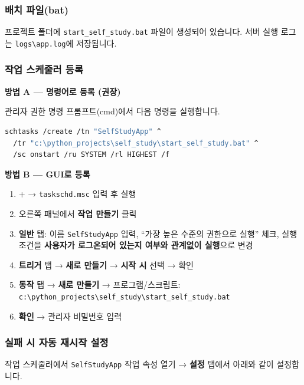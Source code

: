 \documentclass[a4paper,12pt]{article}
\newcommand{\menu}[1]{\textcolor{primary}{\textbf{#1}}}
\newcommand{\key}[1]{\fbox{\small\texttt{#1}}}
\begin{document}
\subsubsection{배치 파일(bat)}

프로젝트 폴더에 \texttt{start\_self\_study.bat} 파일이 생성되어 있습니다.
서버 실행 로그는 \texttt{logs\textbackslash app.log}에 저장됩니다.

\subsubsection{작업 스케줄러 등록}

\textbf{방법 A --- 명령어로 등록 (권장)}

관리자 권한 명령 프롬프트(cmd)에서 다음 명령을 실행합니다.

\begin{lstlisting}[language=bash, caption=작업 스케줄러 명령어 등록]
schtasks /create /tn "SelfStudyApp" ^
  /tr "c:\python_projects\self_study\start_self_study.bat" ^
  /sc onstart /ru SYSTEM /rl HIGHEST /f
\end{lstlisting}

\textbf{방법 B --- GUI로 등록}

\begin{enumerate}[leftmargin=1.5em]
    \item \key{Win}+\key{R} → \texttt{taskschd.msc} 입력 후 실행
    \item 오른쪽 패널에서 \menu{작업 만들기} 클릭
    \item \textbf{일반} 탭: 이름 \texttt{SelfStudyApp} 입력,
          ``가장 높은 수준의 권한으로 실행'' 체크,
          실행 조건을 \menu{사용자가 로그온되어 있는지 여부와 관계없이 실행}으로 변경
    \item \textbf{트리거} 탭 → \menu{새로 만들기} → \menu{시작 시} 선택 → 확인
    \item \textbf{동작} 탭 → \menu{새로 만들기} → 프로그램/스크립트:\\
          \texttt{c:\textbackslash python\_projects\textbackslash self\_study\textbackslash start\_self\_study.bat}
    \item \menu{확인} → 관리자 비밀번호 입력
\end{enumerate}

\subsubsection{실패 시 자동 재시작 설정}

작업 스케줄러에서 \texttt{SelfStudyApp} 작업 속성 열기 →
\textbf{설정} 탭에서 아래와 같이 설정합니다.
\end{document}
